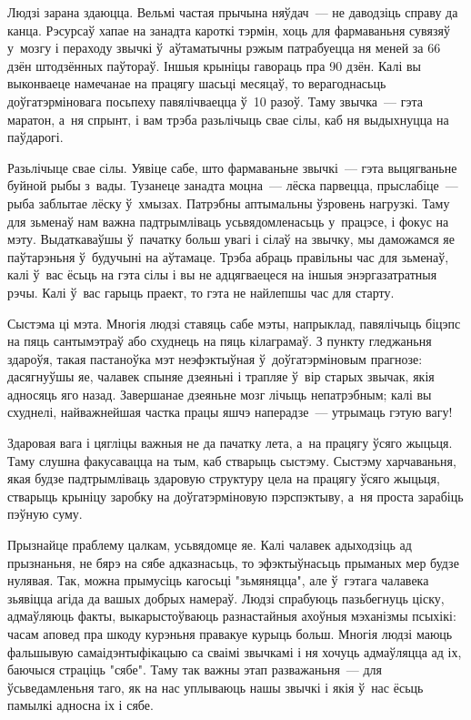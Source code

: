 Людзі зарана здаюцца. Вельмі частая прычына няўдач~--- не даводзіць справу да канца. Рэсурсаў хапае на занадта кароткі тэрмін, хоць для фармаваньня сувязяў у~мозгу і пераходу звычкі ў~аўтаматычны рэжым патрабуецца ня меней за 66 дзён штодзённых паўтораў. Іншыя крыніцы гавораць пра 90 дзён. Калі вы выконваеце намечанае на працягу шасьці месяцаў, то верагоднасьць доўгатэрміновага посьпеху павялічваецца ў~10 разоў. Таму звычка~--- гэта маратон, а~ня спрынт, і вам трэба разьлічыць свае сілы, каб ня выдыхнуцца на паўдарогі.

Разьлічыце свае сілы. Уявіце сабе, што фармаваньне звычкі~--- гэта выцягваньне буйной рыбы з~вады. Тузанеце занадта моцна~--- лёска парвецца, прыслабіце~--- рыба заблытае лёску ў~хмызах. Патрэбны аптымальны ўзровень нагрузкі. Таму для зьменаў нам важна падтрымліваць усьвядомленасьць у~працэсе, і фокус на мэту. Выдаткаваўшы ў~пачатку больш увагі і сілаў на звычку, мы даможамся яе паўтарэньня ў~будучыні на аўтамаце. Трэба абраць правільны час для зьменаў, калі ў~вас ёсьць на гэта сілы і вы не адцягваецеся на іншыя энэргазатратныя рэчы. Калі ў~вас гарыць праект, то гэта не найлепшы час для старту.

Сыстэма ці мэта. Многія людзі ставяць сабе мэты, напрыклад, павялічыць біцэпс на пяць сантымэтраў або схуднець на пяць кілаграмаў. З пункту гледжаньня здароўя, такая пастаноўка мэт неэфэктыўная ў~доўгатэрміновым прагнозе: дасягнуўшы яе, чалавек спыняе дзеяньні і трапляе ў~вір старых звычак, якія адносяць яго назад. Завершанае дзеяньне мозг лічыць непатрэбным; калі вы схуднелі, найважнейшая частка працы яшчэ наперадзе~--- утрымаць гэтую вагу! 

Здаровая вага і цягліцы важныя не да пачатку лета, а~на працягу ўсяго жыцьця. Таму слушна факусавацца на тым, каб стварыць сыстэму. Сыстэму харчаваньня, якая будзе падтрымліваць здаровую структуру цела на працягу ўсяго жыцьця, стварыць крыніцу заробку на доўгатэрміновую пэрспэктыву, а~ня проста зарабіць пэўную суму.

Прызнайце праблему цалкам, усьвядомце яе. Калі чалавек адыходзіць ад прызнаньня, не бярэ на сябе адказнасьць, то эфэктыўнасьць прыманых мер будзе нулявая. Так, можна прымусіць кагосьці "зьмяняцца", але ў~гэтага чалавека зьявіцца агіда да вашых добрых намераў. Людзі спрабуюць пазьбегнуць ціску, адмаўляюць факты, выкарыстоўваюць разнастайныя ахоўныя мэханізмы псыхікі: часам аповед пра шкоду курэньня правакуе курыць больш. Многія людзі маюць фальшывую самаідэнтыфікацыю са сваімі звычкамі і ня хочуць адмаўляцца ад іх, баючыся страціць "сябе". Таму так важны этап разважаньня~--- для ўсьведамленьня таго, як на нас уплываюць нашы звычкі і якія ў~нас ёсьць памылкі адносна іх і сябе.

